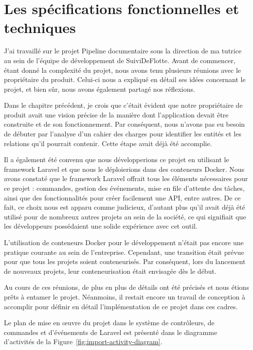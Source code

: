 \chapter{Les spécifications fonctionnelles et techniques}\label{ch:specifications-fonctionnelles-techniques}

J'ai travaillé sur le projet Pipeline documentaire sous la direction de ma tutrice au sein de l'équipe de développement de SuiviDeFlotte. Avant de commencer, étant donné la complexité du projet, nous avons tenu plusieurs réunions avec le propriétaire du produit. Celui-ci nous a expliqué en détail ses idées concernant le projet, et bien sûr, nous avons également partagé nos réflexions.

Dans le chapitre précédent, je crois que c'était évident que notre propriétaire de produit avait une vision précise de la manière dont l'application devait être construite et de son fonctionnement. Par conséquent, nous n'avons pas eu besoin de débuter par l'analyse d'un cahier des charges pour identifier les entités et les relations qu'il pourrait contenir. Cette étape avait déjà été accomplie.

Il a également été convenu que nous développerions ce projet en utilisant le framework Laravel et que nous le déploierions dans des conteneurs Docker. Nous avons constaté que le framework Laravel offrait tous les éléments nécessaires pour ce projet : commandes, gestion des événements, mise en file d'attente des tâches, ainsi que des fonctionnalités pour créer facilement une API, entre autres. De ce fait, ce choix nous est apparu comme judicieux, d'autant plus qu'il avait déjà été utilisé pour de nombreux autres projets au sein de la société, ce qui signifiait que les développeurs possédaient une solide expérience avec cet outil.

L'utilisation de conteneurs Docker pour le développement n'était pas encore une pratique courante au sein de l'entreprise. Cependant, une transition était prévue pour que tous les projets soient conteneurisés. Par conséquent, lors du lancement de nouveaux projets, leur conteneurisation était envisagée dès le début.

Au cours de ces réunions, de plus en plus de détails ont été précisés et nous étions prêts à entamer le projet. Néanmoins, il restait encore un travail de conception à accomplir pour définir en détail l'implémentation de ce projet dans ces cadres.

Le plan de mise en œuvre du projet dans le système de contrôleurs, de commandes et d'événements de Laravel est présenté dans le diagramme d'activités de la Figure~\ref{fig:import-activity-diagram}.

